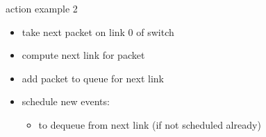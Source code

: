 \begin{frame}{action example 2}
\begin{itemize}
    \item take next packet on link 0 of switch
    \item compute next link for packet
    \item add packet to queue for next link
    \item schedule new events:
        \begin{itemize}
        \item to dequeue from next link (if not scheduled already)
        \end{itemize}
\end{itemize}
\end{frame}

